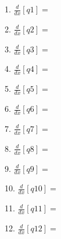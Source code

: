\documentclass{article}
\begin{document}
 


\LARGE


1. $\frac{d}{dx}[{{ q1 }}]=$

\vspace{30pt}

2. $\frac{d}{dx}[{{ q2 }}]=$

\vspace{30pt}

3. $\frac{d}{dx}[{{ q3 }}]=$

\vspace{30pt}

4. $\frac{d}{dx}[{{ q4 }}]=$

\vspace{30pt}

5. $\frac{d}{dx}[{{ q5 }}]=$

\vspace{30pt}

6. $\frac{d}{dx}[{{ q6 }}]=$

\vspace{30pt}

7. $\frac{d}{dx}[{{ q7 }}]=$

\vspace{30pt}
8. $\frac{d}{dx}[{{ q8 }}]=$

\vspace{30pt}

9. $\frac{d}{dx}[{{ q9 }}]=$

\vspace{30pt}

10. $\frac{d}{dx}[{{ q10 }}]=$

\vspace{30pt}

11. $\frac{d}{dx}[{{ q11 }}]=$

\vspace{30pt}

12. $\frac{d}{dx}[{{ q12 }}]=$

\vspace{30pt}
\end{document}
